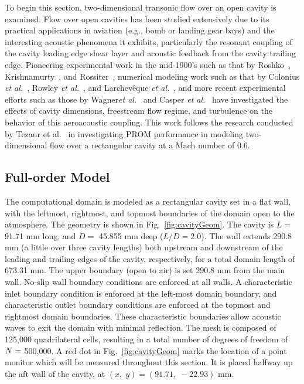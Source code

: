 

To begin this section, two-dimensional transonic flow over an open cavity is examined. Flow over open cavities has been studied extensively due to its practical applications in aviation (e.g., bomb or landing gear bays) and the interesting acoustic phenomena it exhibits, particularly the resonant coupling of the cavity leading edge shear layer and acoustic feedback from the cavity trailing edge. Pioneering experimental work in the mid-1900's such as that by Roshko~\cite{Roshko1952}, Krishnamurty~\cite{Krishnamurty1955}, and Rossiter~\cite{Rossiter1964}, numerical modeling work such as that by Colonius \textit{et al.}~\cite{Colonius1999}, Rowley \textit{et al.}~\cite{Rowley2002}, and Larchev\^{e}que \textit{et al.}~\cite{Larcheveque2007}, and more recent experimental efforts such as those by Wagner\textit{et al.}~\cite{Wagner2015} and Casper \textit{et al.}~\cite{Casper2018} have investigated the effects of cavity dimensions, freestream flow regime, and turbulence on the behavior of this aeroacoustic coupling. This work follows the research conducted by Tezaur et al.~\cite{Tezaur2016,Tezaur2017} in investigating PROM performance in modeling two-dimensional flow over a rectangular cavity at a Mach number of 0.6.

\subsection{Full-order Model}

The computational domain is modeled as a rectangular cavity set in a flat wall, with the leftmost, rightmost, and topmost boundaries of the domain open to the atmosphere. The geometry is shown in Fig.~\ref{fig:cavityGeom}. The cavity is $L =$ 91.71 mm long, and $D =$ 45.855 mm deep ($L/D = 2.0$). The wall extends 290.8 mm (a little over three cavity lengths) both upstream and downstream of the leading and trailing edges of the cavity, respectively, for a total domain length of 673.31 mm. The upper boundary (open to air) is set 290.8 mm from the main wall. No-slip wall boundary conditions are enforced at all walls. A characteristic inlet boundary condition is enforced at the left-most domain boundary, and characteristic outlet boundary conditions are enforced at the topmost and rightmost domain boundaries. These characteristic boundaries allow acoustic waves to exit the domain with minimal reflection. The mesh is composed of 125,000 quadrilateral cells, resulting in a total number of degrees of freedom of $N =$ 500,000. A red dot in Fig.~\ref{fig:cavityGeom} marks the location of a point monitor which will be measured throughout this section. It is placed halfway up the aft wall of the cavity, at $(x, \; y) = (91.71, \; -22.93)$ mm.

